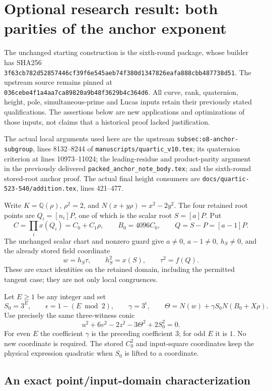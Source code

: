 \section{Optional research result: both parities of the anchor exponent}

The unchanged starting construction is the sixth-round package, whose
builder has SHA256
\texttt{3f63cb782d52857446cf39f6e545aeb74f380d1347826eafa888cbb487738d51}.
The upstream source remains pinned at
\texttt{036cebe4f1a4aa7ca89820a9b48f3629b4c364d6}.
All curve, rank, quaternion, height, pole, simultaneous-prime and Lucas
inputs retain their previously stated qualifications.  The assertions
below are new applications and optimizations of those inputs, not claims
that a historical proof lacked justification.

The actual local arguments used here are the upstream
\texttt{subsec:o8-anchor-subgroup}, lines 8132--8244 of
\texttt{manuscripts/quartic\_v10.tex}; its quaternion criterion at
lines 10973--11024; the leading-residue and product-parity argument in the
previously delivered \texttt{packed\_anchor\_note\_body.tex}; and the
sixth-round stored-root anchor proof.  The actual final height consumers
are \texttt{docs/quartic-523-540/addition.tex}, lines 421--477.

Write $K=\mathbb Q(\rho)$, $\rho^2=2$, and
$N(x+y\rho)=x^2-2y^2$.  The four retained root points are
$Q_i=[n_i]P$, one of which is the scalar root $S=[a]P$.  Put
\[
 C=\prod_i x(Q_i)=C_0+C_1\rho,\qquad B_0=4096C_0,
 \qquad Q=S-P=[a-1]P.
\]
The unchanged scalar chart and nonzero guard give
$a\ne0$, $a-1\ne0$, $h_S\ne0$, and the already stored field coordinate
\[
 w=h_S\tau,\qquad h_S^2=x(S),\qquad\tau^2=f(Q).
\]
These are exact identities on the retained domain, including the
permitted tangent case; they are not only local congruences.

Let $E\ge1$ be any integer and set
\[
 S_0=3^E,\qquad \epsilon=1-(E\bmod2),\qquad
 \gamma=3^\epsilon,\qquad
 \Theta=N(w)+\gamma S_0N(B_0+X\rho).
\]
Use precisely the same three-witness conic
\begin{equation}\label{r7:anchor}
 u^2+6v^2-2z^2-3\Theta^2+2S_0^2=0.
\end{equation}
For even $E$ the coefficient $\gamma$ is the preceding coefficient $3$;
for odd $E$ it is $1$.  No new coordinate is required.  The stored
$C_0^2$ and input-square coordinates keep the physical expression
quadratic when $S_0$ is lifted to a coordinate.

\subsection{An exact point/input-domain characterization}

